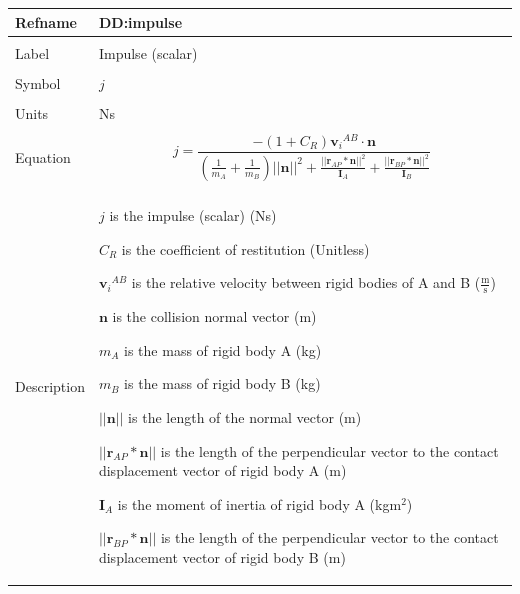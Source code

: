 \documentclass[12pt]{article}
\begin{document}
\noindent \begin{minipage}{\textwidth}
\begin{tabular}{p{} p{}}
\toprule \textbf{Refname} & \textbf{DD:impulse}
\label{DD:impulse}
\\ \midrule \\
Label & Impulse (scalar)
\\ \midrule \\
Symbol & $j$
\\ \midrule \\
Units & Ns
\\ \midrule \\
Equation & \begin{dmath}
           j=\frac{-\left(1+{C_{R}}\right) {{\mathbf{v}_{i}}^{AB}}\cdot{}\mathbf{n}}{\left(\frac{1}{{m_{A}}}+\frac{1}{{m_{B}}}\right) ||\mathbf{n}||^{2}+\frac{||{\mathbf{r}_{AP}}*\mathbf{n}||^{2}}{{\mathbf{I}_{A}}}+\frac{||{\mathbf{r}_{BP}}*\mathbf{n}||^{2}}{{\mathbf{I}_{B}}}}
           \end{dmath}
\\ \midrule \\
Description & \begin{symbDescription}
              \item{$j$ is the impulse (scalar) (Ns)}
              \item{${C_{R}}$ is the coefficient of restitution (Unitless)}
              \item{${{\mathbf{v}_{i}}^{AB}}$ is the relative velocity between rigid bodies of A and B ($\frac{\text{m}}{\text{s}}$)}
              \item{$\mathbf{n}$ is the collision normal vector (m)}
              \item{${m_{A}}$ is the mass of rigid body A (kg)}
              \item{${m_{B}}$ is the mass of rigid body B (kg)}
              \item{$||\mathbf{n}||$ is the length of the normal vector (m)}
              \item{$||{\mathbf{r}_{AP}}*\mathbf{n}||$ is the length of the perpendicular vector to the contact displacement vector of rigid body A (m)}
              \item{${\mathbf{I}_{A}}$ is the moment of inertia of rigid body A (kg$\text{m}^{2}$)}
              \item{$||{\mathbf{r}_{BP}}*\mathbf{n}||$ is the length of the perpendicular vector to the contact displacement vector of rigid body B (m)}

\end{symbDescription}
\end{tabular}
\end{minipage}
\end{document}
